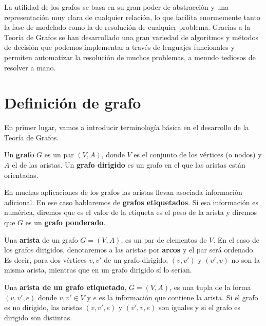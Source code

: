 La utilidad de los grafos se basa en su gran poder de abstracción y una
representación muy clara de cualquier relación, lo que facilita enormemente 
tanto la fase de modelado como la de resolución de cualquier problema. Gracias a
la Teoría de Grafos se han desarrollado una gran variedad de algoritmos y métodos
de decisión que podemos implementar a través de lenguajes funcionales y permiten 
automatizar la resolución de muchos problemas, a menudo  tediosos de resolver a mano.


\minitoc

\section{Definición de grafo}

En primer lugar, vamos a introducir terminología básica en el desarrollo de la Teoría de 
Grafos.

\begin{definicion}
  Un \textbf{grafo} $G$ es un par $(V,A)$, donde $V$ es el conjunto de los
  vértices (o nodos) y $A$ el de las aristas. Un \textbf{grafo dirigido} es un
  grafo en el que las aristas están orientadas.
  
  En muchas aplicaciones de los grafos las aristas llevan asociada información adicional.
  En ese caso hablaremos de \textbf{grafos etiquetados}. Si esa información es numérica,
  diremos que es el valor de la etiqueta es el peso de la arista y diremos que $G$ es un
  \textbf{grafo ponderado}.
\end{definicion}

\begin{definicion}
  Una \textbf{arista} de un grafo $G=(V,A)$, es un par de elementos
  de $V$. En el caso de los grafos dirigidos, denotaremos a las aristas por 
  \textbf{arcos} y el par será ordenado. Es decir, para dos vértices $v,v'$ de un grafo
  dirigido, $(v,v')$ y $(v',v)$ no son la misma arista, mientras que en un grafo 
  dirigido sí lo serían.

  Una \textbf{arista de un grafo etiquetado}, $G=(V,A)$, es una tupla de la forma
  $(v,v',e)$ donde $v,v' \in V$ y $e$ es la información que contiene la arista.
  Si el grafo es no dirigido, las aristas  $(v,v',e)$ y  $(v',v,e)$ son iguales y si
  el grafo es dirigido son distintas. 
\end{definicion}


